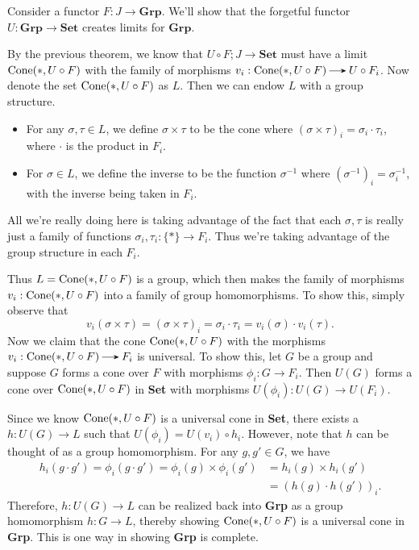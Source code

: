     \begin{example}
        Consider a functor $F: J \to \textbf{Grp}$. We'll show that
        the forgetful functor $U:\textbf{Grp} \to \textbf{Set}$
        creates limits for $\textbf{Grp}$.

        By the previous theorem, we know that $U \circ F; J \to
        \textbf{Set}$ must have a limit $\operatorname{\mathrm{Cone}}(*, U \circ F)$ 
        with the family of morphisms $v_i: \cone(*, U\circ F) \to
        U\circ F_i$. 
        Now denote the set $\operatorname{\mathrm{Cone}}(*,U \circ F)$ as $L$. 
        Then we can endow $L$ with a group structure.
        \begin{itemize}
            \item For any $\sigma, \tau \in L$, we define $\sigma
            \times \tau$ to be the cone where $(\sigma \times \tau)_i =
            \sigma_i \cdot \tau_i$, where $\cdot$ is the product in
            $F_i$. 

            \item For $\sigma \in L$, we define the inverse to be   
            the function $\sigma^{-1}$ where $(\sigma^{-1})_i =
            \sigma_i^{-1}$, with the inverse being taken in $F_i$. 
        \end{itemize}
        All we're really doing here is taking advantage of the fact 
        that each $\sigma, \tau$ is really just a family of functions 
        $\sigma_i, \tau_i: \{*\} \to F_i$. Thus we're taking advantage
        of the group structure in each $F_i$. 

        Thus $L = \operatorname{\mathrm{Cone}}(*, U \circ F)$ is a group, which then makes
        the family of morphisms $v_i: \operatorname{\mathrm{Cone}}(*, U \circ F)$ into a
        family of group homomorphisms. To show this, simply observe
        that 
        \[
            v_i(\sigma \times \tau) = (\sigma \times \tau)_i = \sigma_i \cdot \tau_i = v_i(\sigma)\cdot v_i(\tau).           
        \]
        Now we claim that the cone $\operatorname{\mathrm{Cone}}(*, U \circ F)$ with the
        morphisms $v_i: \cone(*, U \circ F) \to F_i$ is universal. To
        show this, let $G$ be a group and suppose $G$ forms a cone over $F$ 
        with morphisms $\phi_i: G \to F_i$. Then $U(G)$ forms a cone
        over $\operatorname{\mathrm{Cone}}(*, U \circ F)$ in \textbf{Set} with morphisms 
        $U(\phi_i): U(G) \to U(F_i)$. 

        Since we know $\operatorname{\mathrm{Cone}}(*, U \circ F)$ is a universal cone in \textbf{Set}, 
        there exists a $h: U(G) \to L$ such that $U(\phi_i) =
        U(v_i)\circ h_i$. However, note that $h$ can be thought of as a 
        group homomorphism. For any $g, g' \in G$, we have
        \begin{align*}
            h_i(g \cdot g') = \phi_i(g \cdot g') 
            = \phi_i(g) \times \phi_i(g')
            &= h_i(g) \times h_i(g')\\
            &= (h(g) \cdot h(g'))_i.
        \end{align*}
        Therefore, $h:U(G) \to L$ can be realized back into \textbf{Grp}
        as a group homomorphism $h: G \to L$, thereby showing $\operatorname{\mathrm{Cone}}(*, U \circ F)$ 
        is a universal cone in \textbf{Grp}. This is one way in showing 
        \textbf{Grp} is complete.
    \end{example}
